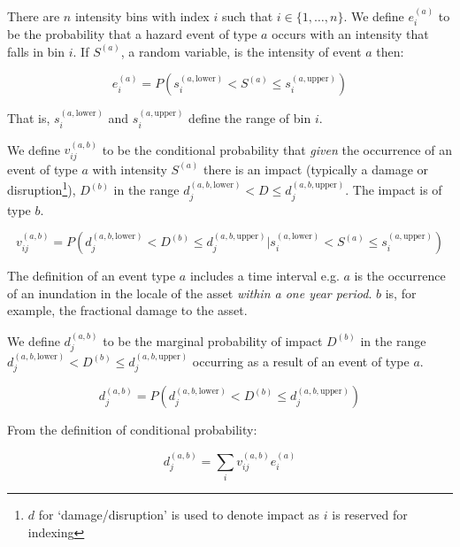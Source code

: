 \documentclass[a4paper,11pt]{extarticle} %
\begin{document}
There are $n$ intensity bins with index $i$ such that $i \in \{1, \dots, n \}$. We define $e^{(a)}_i$ to be the probability that a hazard event of type $a$ occurs with an intensity that falls in bin $i$. If $S^{(a)}$, a random variable, is the intensity of event $a$ then:

\begin{equation}
    \label{Eq:event}
    e^{(a)}_i = P \left( s^{(a, \text{lower})}_i < S^{(a)} \le s^{(a, \text{upper})}_i \right)
\end{equation}

That is, $s^{(a, \text{lower})}_i$ and $s^{(a, \text{upper})}_i$ define the range of bin $i$.

We define $v^{(a, b)}_{ij}$ to be the conditional probability that \emph{given} the occurrence of an event of type $a$ with intensity $S^{(a)}$ there is an impact (typically a damage or disruption\footnote{$d$ for `damage/disruption' is used to denote impact as $i$ is reserved for indexing}), $D^{(b)}$ in the range $d^{(a,b,\text{lower})}_j < D \le d^{(a,b,\text{upper})}_j$. The impact is of type $b$.


\begin{equation}
    \label{Eq:vulnerability}
    v^{(a, b)}_{ij} = P \left( d^{(a,b,\text{lower})}_j < D^{(b)} \le d^{(a,b,\text{upper})}_j | s^{(a, \text{lower})}_i < S^{(a)} \le s^{(a, \text{upper})}_i \right)
\end{equation}

The definition of an event type $a$ includes a time interval e.g. $a$ is the occurrence of an inundation in the locale of the asset {\it within a one year period}. $b$ is, for example, the fractional damage to the asset.

We define $d^{(a,b)}_j$ to be the marginal probability of impact $D^{(b)}$ in the range $d^{(a,b, \text{lower})}_j < D^{(b)} \le d^{(a,b,\text{upper})}_j$ occurring as a result of an event of type $a$.

\begin{equation}
    \label{Eq:impact}
    d^{(a,b)}_j = P \left( d^{(a,b,\text{lower})}_j < D^{(b)} \le d^{(a,b,\text{upper})}_j \right)
\end{equation}

From the definition of conditional probability:

\begin{equation}
    \label{Eq:model}
    d^{(a,b)}_j = \sum_{i} v^{(a,b)}_{ij} e^{(a)}_i
\end{equation}
\end{document}
